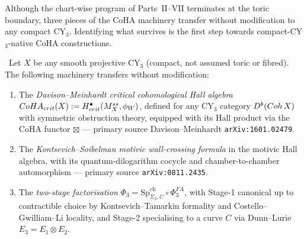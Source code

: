 Although the chart-wise program of Parts~II--VII terminates at the
toric boundary, three pieces of the CoHA machinery transfer without
modification to any compact CY$_3$. Identifying what survives is the
first step towards compact-CY$_3$-native CoHA constructions.

\begin{proposition}
\label{prop:stratum-free}
\ClaimStatusProposition\
Let $X$ be any smooth projective CY$_3$ (compact, not assumed toric or
fibred). The following machinery transfers without modification:
\begin{enumerate}[leftmargin=2em]
\item The \emph{Davison--Meinhardt critical cohomological Hall algebra}
  $CoHA_{crit}(X) := H^\bullet_{crit}(M_X^{ss},
  \phi_{W})$, defined for any CY$_3$ category $D^b(Coh\,X)$ with
  symmetric obstruction theory, equipped with its Hall product via the
  CoHA functor $\boxtimes$ --- primary source Davison--Meinhardt
  \texttt{arXiv:1601.02479}.
\item The \emph{Kontsevich--Soibelman motivic wall-crossing formula}
  in the motivic Hall algebra, with its quantum-dilogarithm cocycle and
  chamber-to-chamber automorphism --- primary source
  \texttt{arXiv:0811.2435}.
\item The \emph{two-stage factorisation} $\Phi_3 =
  \mathrm{Sp}^{\mathrm{ch}}_{\Sigma_2, C} \circ \Phi^{FA}_3$, with
  Stage-1 canonical up to contractible choice by Kontsevich--Tamarkin
  formality and Costello--Gwilliam--Li locality, and Stage-2 specialising
  to a curve $C$ via Dunn--Lurie $E_3 = E_1 \otimes E_2$.
\end{enumerate}
\end{proposition}


